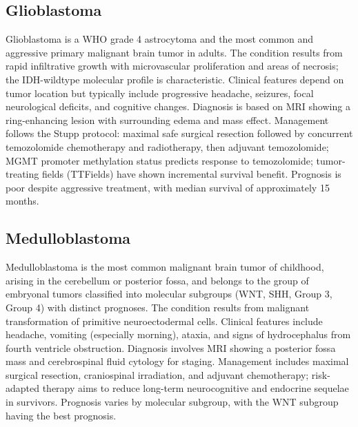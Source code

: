 \subsection{Glioblastoma}
\label{sec:Glioblastoma}

Glioblastoma is a WHO grade 4 astrocytoma and the most common and aggressive primary malignant brain tumor in adults. The condition results from rapid infiltrative growth with microvascular proliferation and areas of necrosis; the IDH-wildtype molecular profile is characteristic. Clinical features depend on tumor location but typically include progressive headache, seizures, focal neurological deficits, and cognitive changes. Diagnosis is based on MRI showing a ring-enhancing lesion with surrounding edema and mass effect. Management follows the Stupp protocol: maximal safe surgical resection followed by concurrent temozolomide chemotherapy and radiotherapy, then adjuvant temozolomide; MGMT promoter methylation status predicts response to temozolomide; tumor-treating fields (TTFields) have shown incremental survival benefit. Prognosis is poor despite aggressive treatment, with median survival of approximately 15 months.

\subsection{Medulloblastoma}
\label{sec:Medulloblastoma}
Medulloblastoma is the most common malignant brain tumor of childhood, arising in the cerebellum or posterior fossa, and belongs to the group of embryonal tumors classified into molecular subgroups (WNT, SHH, Group 3, Group 4) with distinct prognoses. The condition results from malignant transformation of primitive neuroectodermal cells. Clinical features include headache, vomiting (especially morning), ataxia, and signs of hydrocephalus from fourth ventricle obstruction. Diagnosis involves MRI showing a posterior fossa mass and cerebrospinal fluid cytology for staging. Management includes maximal surgical resection, craniospinal irradiation, and adjuvant chemotherapy; risk-adapted therapy aims to reduce long-term neurocognitive and endocrine sequelae in survivors. Prognosis varies by molecular subgroup, with the WNT subgroup having the best prognosis.

